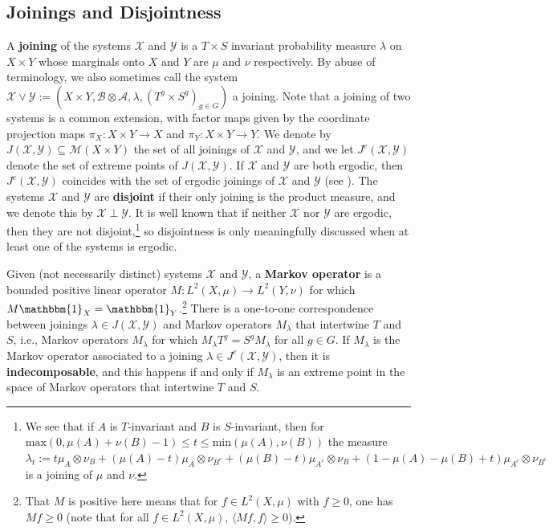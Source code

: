 \documentclass[graybox]{svmult}
\theoremstyle{definition}
\begin{document}
\subsection{Joinings and Disjointness}\label{ssec:JoiningsAndDisjointness}
A \textbf{joining} of the systems $\mathcal{X}$ and $\mathcal{Y}$ is a $T\times S$ invariant probability measure $\lambda$ on $X\times Y$ whose marginals onto $X$ and $Y$ are $\mu$ and $\nu$ respectively. 
By abuse of terminology, we also sometimes call the system $\mathcal{X}\vee\mathcal{Y} := (X\times Y,\mathscr{B}\otimes\mathscr{A},\lambda,(T^g\times S^g)_{g \in G})$ a joining.
Note that a joining of two systems is a common extension, with factor maps given by the coordinate projection maps $\pi_X:X\times Y\to X$ and $\pi_Y:X\times Y\to Y$. 
We denote by $J(\mathcal{X},\mathcal{Y}) \subseteq \mathcal{M}(X\times Y)$ the set of all joinings of $\mathcal{X}$ and $\mathcal{Y}$, and we let $J^e(\mathcal{X},\mathcal{Y})$ denote the set of extreme points of $J(\mathcal{X},\mathcal{Y})$.
If $\mathcal{X}$ and $\mathcal{Y}$ are both ergodic, then $J^e(\mathcal{X},\mathcal{Y})$ coincides with the set of ergodic joinings of $\mathcal{X}$ and $\mathcal{Y}$ (see \cite[Theorem 6.2]{ErgodicTheoryViaJoinings}).
The systems $\mathcal{X}$ and $\mathcal{Y}$ are \textbf{disjoint} if their only joining is the product measure, and we denote this by $\mathcal{X}\perp\mathcal{Y}$.
It is well known that if neither $\mathcal{X}$ nor $\mathcal{Y}$ are ergodic, then they are not disjoint,\footnote{\label{fn:NoErgodicityNoDisjointness} We see that if $A$ is $T$-invariant and $B$ is $S$-invariant, then for $\text{max}(0,\mu(A)+\nu(B)-1) \le t \le \text{min}(\mu(A),\nu(B))$ the measure $\lambda_t := t\mu_A\otimes\nu_B+(\mu(A)-t)\mu_A\otimes\nu_{B^c}+(\mu(B)-t)\mu_{A^c}\otimes\nu_B+(1-\mu(A)-\mu(B)+t)\mu_{A^c}\otimes\nu_{B^c}$ is a joining of $\mu$ and $\nu$.} so disjointness is only meaningfully discussed when at least one of the systems is ergodic.

Given (not necessarily distinct) systems $\mathcal{X}$ and $\mathcal{Y}$, a \textbf{Markov operator} is a bounded positive linear operator $M:L^2(X,\mu)\rightarrow L^2(Y,\nu)$ for which $M\mathbbm{1}_X = \mathbbm{1}_Y$.\footnote{That $M$ is positive here means that for $f\in L^2(X,\mu)$ with $f\geq 0$, one has $Mf\geq 0$ (note that for all $f\in L^2(X,\mu)$, $\langle Mf,f\rangle\geq 0$).}
There is a one-to-one correspondence between joinings $\lambda \in J(\mathcal{X},\mathcal{Y})$ and Markov operators $M_\lambda$ that intertwine $T$ and $S$, i.e., Markov operators $M_\lambda$ for which $M_\lambda T^g = S^gM_\lambda$ for all $g \in G$.
If $M_\lambda$ is the Markov operator associated to a joining $\lambda \in J^e(\mathcal{X},\mathcal{Y})$, then it is \textbf{indecomposable}, and this happens if and only if $M_\lambda$ is an extreme point in the space of Markov operators that intertwine $T$ and $S$.
\end{document}
